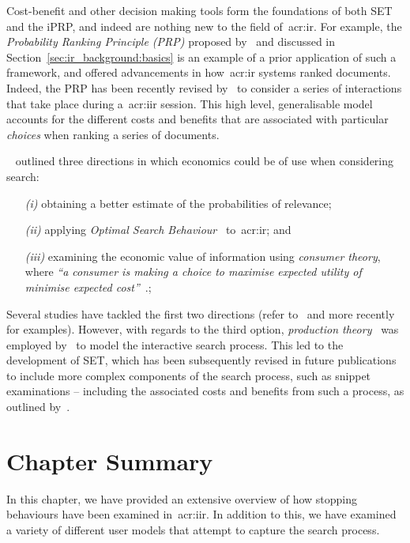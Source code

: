 \noindent
{} Cost-benefit and other decision making tools form the foundations of both SET and the iPRP, and indeed are nothing new to the field of~\gls{acr:ir}. For example, the \emph{Probability Ranking Principle (PRP)} proposed by~\cite{robertson1977prp} and discussed in Section~\ref{sec:ir_background:basics} is an example of a prior application of such a framework, and offered advancements in how~\gls{acr:ir} systems ranked documents. Indeed, the PRP has been recently revised by~\cite{fuhr2008iprp} to consider a series of interactions that take place during a~\gls{acr:iir} session. This high level, generalisable model accounts for the different costs and benefits that are associated with particular \emph{choices} when ranking a series of documents.

\noindent
{}~\cite{varian1999economics} outlined three directions in which economics could be of use when considering search:

\begin{itemize}
    \item[\emph{(i)}]{obtaining a better estimate of the probabilities of relevance;}
    \item[\emph{(ii)}]{applying \emph{Optimal Search Behaviour}~\cite{stigler1961economics} to~\gls{acr:ir}; and}
    \item[\emph{(iii)}]{examining the economic value of information using \emph{consumer theory}, where \emph{``a consumer is making a choice to maximise expected utility of minimise expected cost''}~\citep{varian1999economics}.;}
\end{itemize}

Several studies have tackled the first two directions (refer to~\cite{birchler1999information} and more recently~\cite{wang2009economics} for examples). However, with regards to the third option, \emph{production theory}~\cite{varian1987intermediate} was employed by~\cite{azzopardi2011economics} to model the interactive search process. This led to the development of SET, which has been subsequently revised in future publications to include more complex components of the search process, such as snippet examinations -- including the associated costs and benefits from such a process, as outlined by~\cite{azzopardi2014economics}.

\section{Chapter Summary}
In this chapter, we have provided an extensive overview of how stopping behaviours have been examined in~\gls{acr:iir}. In addition to this, we have examined a variety of different user models that attempt to capture the search process.


